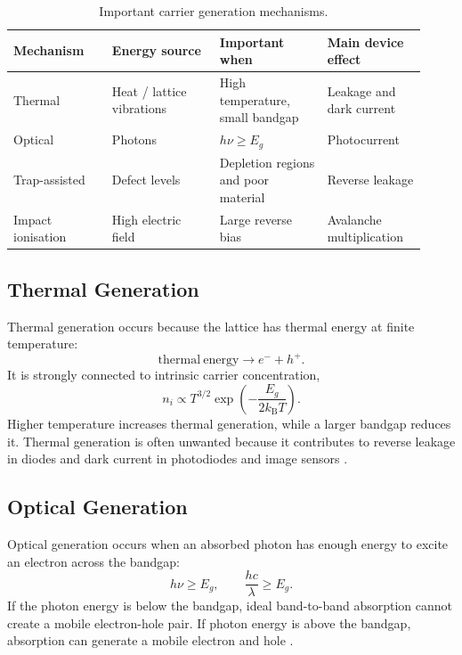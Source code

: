 \documentclass[11pt,a4paper]{article}
\newcommand{\kb}{k_{\mathrm{B}}}
\newcommand{\nint}{n_i}
\begin{document}
\begin{table}[h]
\centering
\caption{Important carrier generation mechanisms.}
\begin{tabular}{p{0.22\linewidth}p{0.24\linewidth}p{0.24\linewidth}p{0.22\linewidth}}
\toprule
Mechanism & Energy source & Important when & Main device effect\\
\midrule
Thermal & Heat / lattice vibrations & High temperature, small bandgap & Leakage and dark current\\
Optical & Photons & \(h\nu\ge E_g\) & Photocurrent\\
Trap-assisted & Defect levels & Depletion regions and poor material & Reverse leakage\\
Impact ionisation & High electric field & Large reverse bias & Avalanche multiplication\\
\bottomrule
\end{tabular}
\end{table}

\subsection{Thermal Generation}

Thermal generation occurs because the lattice has thermal energy at finite temperature:
\begin{equation}
  \mathrm{thermal\ energy}\rightarrow e^-+h^+ .
\end{equation}
It is strongly connected to intrinsic carrier concentration,
\begin{equation}
  \nint \propto T^{3/2}\exp\left(-\frac{E_g}{2\kb T}\right).
\end{equation}
Higher temperature increases thermal generation, while a larger bandgap reduces it. Thermal generation is often unwanted because it contributes to reverse leakage in diodes and dark current in photodiodes and image sensors \cite{pveducation_i0,mit6720}.

\subsection{Optical Generation}

Optical generation occurs when an absorbed photon has enough energy to excite an electron across the bandgap:
\begin{equation}
  h\nu \ge E_g,\qquad \frac{hc}{\lambda}\ge E_g .
\end{equation}
If the photon energy is below the bandgap, ideal band-to-band absorption cannot create a mobile electron-hole pair. If photon energy is above the bandgap, absorption can generate a mobile electron and hole \cite{entner2007,pveducation_diffusion}.
\end{document}
